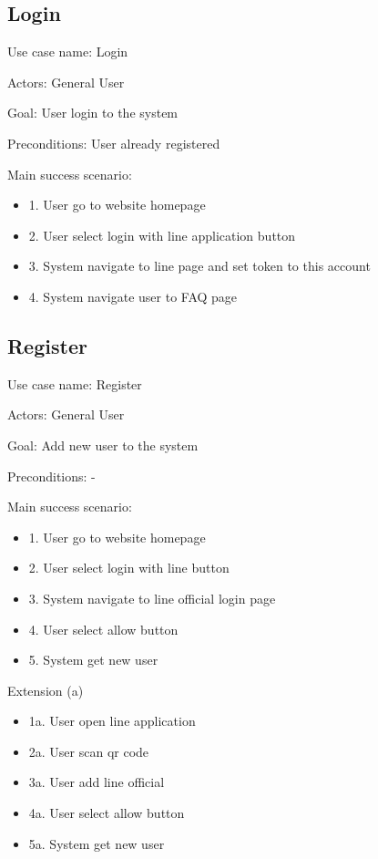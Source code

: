 \documentclass[12pt,oneside,openright,a4paper]{cpe-english-project}
\begin{document}
    \subsection{Login}
      \qquad Use case name: Login \par
      \qquad Actors: General User \par
      \qquad Goal: User login to the system \par
      \qquad Preconditions: User already registered \par
      \qquad Main success scenario:
      \begin{itemize}
        \item[] 1. User go to website homepage
        \item[] 2. User select login with line application button
        \item[] 3. System navigate to line page and set token to this account
        \item[] 4. System navigate user to FAQ page
      \end{itemize}

      \subsection{Register}
        \qquad Use case name: Register \par
        \qquad Actors: General User \par
        \qquad Goal: Add new user to the system \par
        \qquad Preconditions: - \par
        \qquad Main success scenario:
        \begin{itemize}
          \item[] 1. User go to website homepage
          \item[] 2. User select login with line button
          \item[] 3. System navigate to line official login page
          \item[] 4. User select allow button
          \item[] 5. System get new user
        \end{itemize}
        \qquad Extension (a)
        \begin{itemize}
          \item[] 1a. User open line application
          \item[] 2a. User scan qr code
          \item[] 3a. User add line official
          \item[] 4a. User select allow button
          \item[] 5a. System get new user
        \end{itemize}
      
\end{document}

